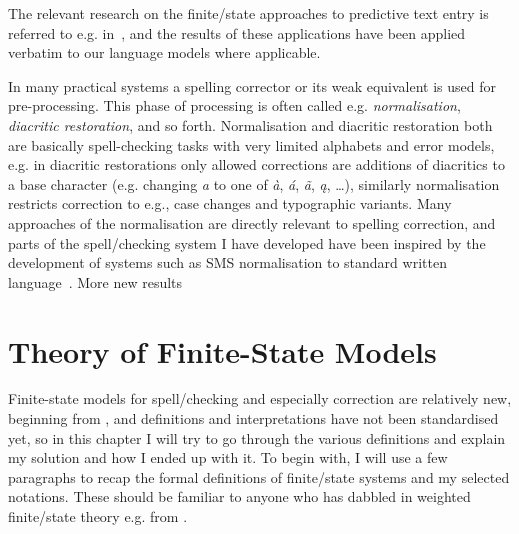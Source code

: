 \documentclass[officiallayout]{unihelcompling}
\begin{document}
The relevant research on the finite\-/state approaches to predictive text entry
is referred to e.g. in~\citet{silfverberg2010partofspeech}, and the results of
these applications have been applied verbatim to our language models where
applicable.

In many practical systems a spelling corrector or its weak equivalent is used
for pre-processing. This phase of processing is often called e.g.
\emph{normalisation}, \emph{diacritic restoration}, and so forth. Normalisation
and diacritic restoration both are basically spell-checking tasks with very
limited alphabets and error models, e.g. in diacritic restorations only allowed
corrections are additions of diacritics to a base character (e.g. changing
\emph{a} to one of \emph{à}, \emph{á}, \emph{ã}, \emph{ą}, \ldots), similarly
normalisation restricts correction to e.g., case changes and typographic
variants.  Many approaches of the normalisation are directly relevant to
spelling correction, and parts of the spell\-/checking system I have developed
have been inspired by the development of systems such as SMS normalisation to
standard written language~\citep{kobus2008normalizing}.
More new results\citet{petterson2013,porta2013}

\section{Theory of Finite-State Models}
\label{sec:finite-state-theory}

Finite-state models for spell\-/checking and especially correction are relatively
new, beginning from \citep{oflazer1996errortolerant}, and
definitions and interpretations have not been standardised yet, so in this
chapter I will try to go through the various definitions and explain my
solution and how I ended up with it. To begin with, I will use a few paragraphs
to recap the formal definitions of finite\-/state systems and my selected
notations. These should be familiar to anyone who has dabbled in weighted
finite\-/state theory e.g. from \citet{aho2007compilers,mohri1997finitestate}.
\end{document}
